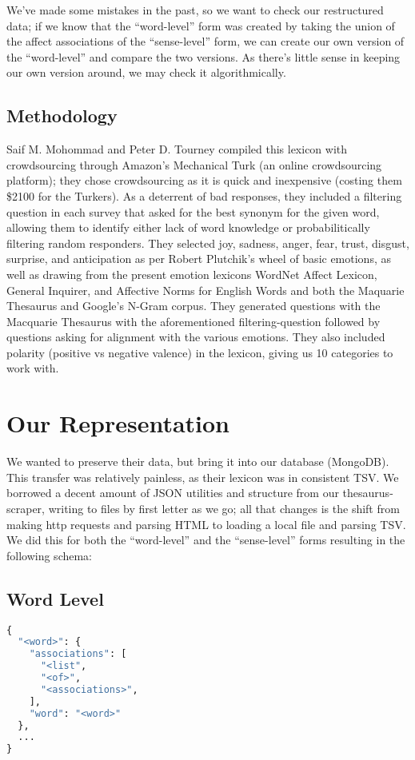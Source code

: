 \documentclass[11pt, twoside, reqno]{book}
\begin{document}
We've made some mistakes in the past, so we want to check our restructured data; if we know that the ``word-level'' form was created by taking the union of the affect associations of the ``sense-level'' form, we can create our own version of the ``word-level'' and compare the two versions. As there's little sense in keeping our own version around, we may check it algorithmically.

\subsection{Methodology}

Saif M. Mohommad and Peter D. Tourney compiled this lexicon with crowdsourcing through Amazon's Mechanical Turk (an online crowdsourcing platform); they chose crowdsourcing as it is quick and inexpensive (costing them \$2100 for the Turkers). As a deterrent of bad responses, they included a filtering question in each survey that asked for the best synonym for the given word, allowing them to identify either lack of word knowledge or probabilitically filtering random responders. They selected joy, sadness, anger, fear, trust, disgust, surprise, and anticipation as per Robert Plutchik's wheel of basic emotions, as well as drawing from the present emotion lexicons WordNet Affect Lexicon, General Inquirer, and Affective Norms for English Words and both the Maquarie Thesaurus and Google's N-Gram corpus. They generated questions with the Macquarie Thesaurus with the aforementioned filtering-question followed by questions asking for alignment with the various emotions. They also included polarity (positive vs negative valence) in the lexicon, giving us 10 categories to work with.


\section{Our Representation}

We wanted to preserve their data, but bring it into our database (MongoDB). This transfer was relatively painless, as their lexicon was in consistent TSV. We borrowed a decent amount of JSON utilities and structure from our thesaurus-scraper, writing to files by first letter as we go; all that changes is the shift from making http requests and parsing HTML to loading a local file and parsing TSV. We did this for both the ``word-level'' and the ``sense-level'' forms resulting in the following schema:

\subsection{Word Level}
\begin{lstlisting}[language=Python]
{
  "<word>": {
    "associations": [
      "<list",
      "<of>",
      "<associations>",
    ],
    "word": "<word>"
  },
  ...
}
\end{lstlisting}
\end{document}
